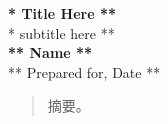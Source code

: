 \begin{titlepage}
    \begin{center}
    {\fontsize{40}{48}\selectfont \bfseries ** Title Here **} 
    \\\vspace{20pt}
    {\LARGE ** subtitle here **} \\
    \vspace{20pt}
    \textbf{** Name **}
    \vspace{8pt}
    \\ ** Prepared for, Date **
    \end{center}

    \bigskip
    \begin{abstract}
       摘要。 
    \end{abstract}
\end{titlepage}